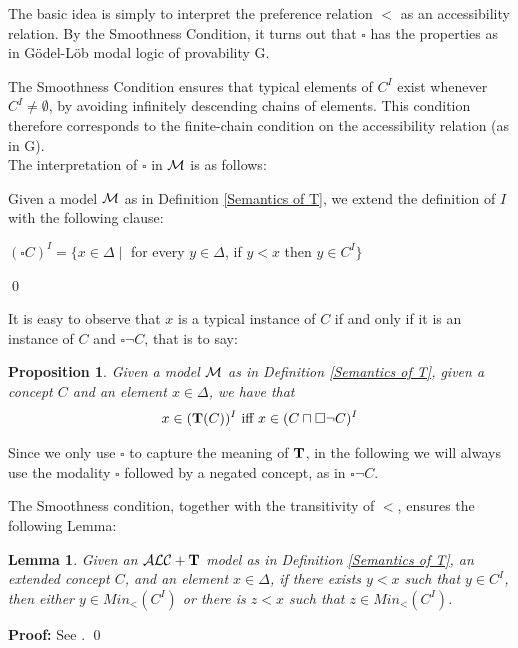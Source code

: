 \documentclass[a4paper, 11pt, oneside]{duthesis}
\newcommand{\tip}{{\bf T}}
\newcommand{\alct}{\mathcal{ALC}+\tip}
\newcommand{\vuoto} {\emptyset}
\newcommand{\nott} {\lnot}
\newcommand{\tc} {\mid}
\newcommand{\appartiene} {\in}
\newcommand{\bbox}{\square}
\newcommand{\diverso} {\neq}
\newcommand{\emme} {\begin{mathcal}M\end{mathcal}}
\newenvironment{proof}
{\begin{trivlist} \item[] {\bf Proof:}}%
{\qed \end{trivlist}}
\newenvironment{definition}
{\begin{defi} \rm}{\qed \end{defi}}
\newenvironment{proof}
{\begin{trivlist} \item[] {\bf Proof:}}%
{\qed \end{trivlist}}
\newenvironment{definition}
{\begin{defi} \rm}{\qed \end{defi}}
\newtheorem{definition}{Definition}
\newtheorem{proposition}{Proposition}
\newtheorem{lemma}{Lemma}
\newcounter{posu}
\newtheorem{lemma}[posu]{Lemma}
\newtheorem{proposition}[posu]{Proposition}
\newtheorem{definition}[posu]{Definition}
\newtheorem{proof}[posu]{Proof}
\begin{document}
The basic idea is simply to interpret the preference relation $<$ as an accessibility relation.
By the Smoothness Condition, it turns out that $\bbox$ has the properties as in G\"odel-L\"ob modal logic of provability G.

The Smoothness Condition ensures that typical elements of $C^I$ exist whenever $C^I \diverso \vuoto$, by avoiding infinitely descending chains of elements.
This condition therefore corresponds to the finite-chain condition on the accessibility relation (as in G).\\

The interpretation of $\bbox$ in $\emme$ is as follows:

\begin{definition}\label{def-box}
Given a model $\emme$ as in Definition \ref{Semantics of T}, we extend the definition of $I$ with the following clause:
\begin{center}
	$(\bbox C)^I = \{x \in \Delta \tc $  for every $y \appartiene \Delta$, if $y < x$ then $y \in C^I \}$
\end{center}
\end{definition}

\newpage

\noindent It is easy to observe that $x$ is a typical instance  of $C$ if and only if it is an instance of $C$ and $\bbox \nott C$, that is to say:

\begin{proposition}\label{Relation between T an box}
Given a model $\emme$ as in Definition \ref{Semantics of T}, given a concept $C$ and an element $x \in \Delta$, we have that $$x \in (\tip(C))^I \ \mbox{iff} \  x \in (C \sqcap \bbox \neg C)^I$$
\end{proposition}

\noindent
Since we only use $\bbox$ to capture the meaning of $\tip$, in the following we will always use the modality $\bbox$ followed by a negated concept, as in $\bbox \neg C$.

The Smoothness condition, together with the transitivity of $<$, ensures the following Lemma:

\begin{lemma}\label{ssc}
Given an $\alct$ model as in Definition \ref{Semantics of T}, an extended concept $C$, and an element $x \in \Delta$, if there exists $y < x$ such that $y \in C^I$, then either $y \in Min_<(C^I)$ or there is $z<x$ such that $z \in Min_<(C^I)$.
\end{lemma}

\begin{proof}
See \cite{Giordano:2013:NDL:2435476.2435957}.
\end{proof}
\end{document}
